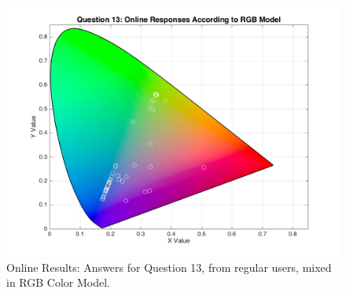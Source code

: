 \begin{figure}[htbp]
\begin{minipage}{0.48\textwidth}
    \includegraphics[width=\textwidth]{images/13_online_RGBresponses.png}
    \caption[Online Results: Answers for Question 13, from regular users, mixed in RGB Color Model.]{Online Results: Answers for Question 13, from regular users, mixed in RGB Color Model.}
    \label{fig:onlinergbregular_13}
  \end{minipage}
\end{figure}
%
